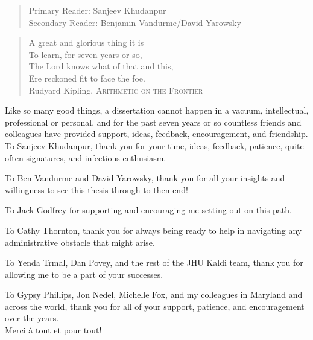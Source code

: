 \begin{frontmatter}
\begin{abstract}
\noindent Primary Reader: Sanjeev Khudanpur\\
Secondary Reader: Benjamin Vandurme/David Yarowsky

\end{abstract}

\begin{acknowledgment}

\begin{quotation}
\noindent A great and glorious thing it is \\
To learn, for seven years or so, \\
The Lord knows what of that and this, \\
\indent Ere reckoned fit to face the foe.\\[2ex]
\footnotesize Rudyard Kipling, \textsc{Arithmetic on the Frontier} \\
\end{quotation}

\noindent Like so many good things, a dissertation cannot happen in a vacuum, intellectual, professional or personal, and for the past seven years or so countless friends and colleagues have provided support, ideas, feedback, encouragement, and friendship.  \\

\hangindent=0.7cm \noindent To Sanjeev Khudanpur, thank you for your time, ideas, feedback, patience, quite often signatures, and infectious enthusiasm.

\hangindent=0.7cm \noindent To Ben Vandurme and David Yarowsky, thank you for all your insights and willingness to see this thesis through to then end!

\hangindent=0.7cm \noindent To Jack Godfrey for supporting and encouraging me setting out on this path.

\hangindent=0.7cm \noindent To Cathy Thornton, thank you for always being ready to help in navigating any administrative obstacle that might arise.

\hangindent=0.7cm \noindent To Yenda Trmal, Dan Povey, and the rest of the JHU Kaldi team, thank you for allowing me to be a part of your successes.

\hangindent=0.7cm \noindent To Gypsy Phillips, Jon Nedel, Michelle Fox, and my colleagues in Maryland and across the world, thank you for all of your support, patience, and encouragement over the years. \\

\hfill Merci \`{a} tout et pour tout!

\end{acknowledgment}


\end{frontmatter}
